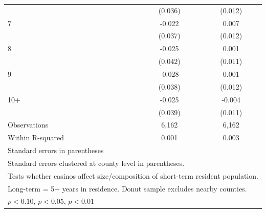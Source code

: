 \begin{table}[htbp]
\begin{tabular}{l*{2}{c}}
            &     (0.036)         &     (0.012)         \\
[1em]
7           &      -0.022         &       0.007         \\
            &     (0.037)         &     (0.012)         \\
[1em]
8           &      -0.025         &       0.001         \\
            &     (0.042)         &     (0.011)         \\
[1em]
9           &      -0.028         &       0.001         \\
            &     (0.038)         &     (0.012)         \\
[1em]
10+         &      -0.025         &      -0.004         \\
            &     (0.039)         &     (0.011)         \\
\hline
Observations&       6,162         &       6,162         \\
Within R-squared&       0.001         &       0.003         \\
\hline\hline
\multicolumn{3}{l}{\footnotesize Standard errors in parentheses}\\
\multicolumn{3}{l}{\footnotesize Standard errors clustered at county level in parentheses.}\\
\multicolumn{3}{l}{\footnotesize Tests whether casinos affect size/composition of short-term resident population.}\\
\multicolumn{3}{l}{\footnotesize Long-term = 5+ years in residence. Donut sample excludes nearby counties.}\\
\multicolumn{3}{l}{\footnotesize \sym{*} \(p<0.10\), \sym{**} \(p<0.05\), \sym{***} \(p<0.01\)}\\
\end{tabular}
\end{table}
